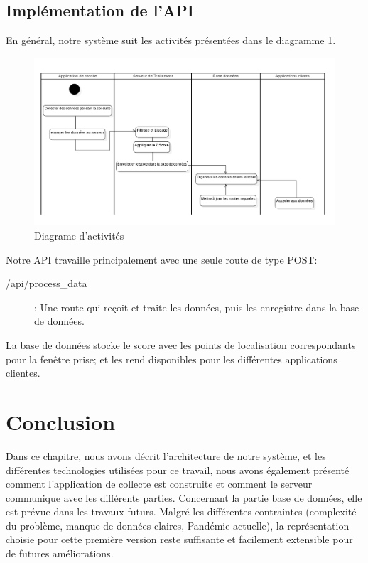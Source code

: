   \subsection{Implémentation de l’API}
  En général, notre système suit les activités présentées dans le diagramme \ref{activityDiagram}.


  \begin{figure}[h!]
    \center
    \includegraphics[width=\textwidth]{Images/chapter3/activityDiagram.png}
    \caption{Diagrame d'activités}
    \label{activityDiagram}
  \end{figure}


  Notre API travaille principalement avec une seule route de type POST:

  
  \begin{description}
    \item[/api/process\_data] : Une route qui reçoit et traite les données, puis les enregistre dans la base de données.  
\end{description}


La base de données stocke le score avec les points de localisation correspondants pour la fenêtre prise; et les rend disponibles pour les différentes applications clientes.

\section{Conclusion}
Dans ce chapitre, nous avons décrit l'architecture de notre système, et les différentes technologies utilisées pour ce travail, nous avons également présenté comment l'application de collecte est construite et comment le serveur communique avec les différents parties. Concernant la partie base de données, elle est prévue dans les travaux futurs. Malgré les différentes contraintes (complexité du problème, manque de données claires, Pandémie actuelle), la représentation choisie pour cette première version reste suffisante et facilement extensible pour de futures améliorations.




